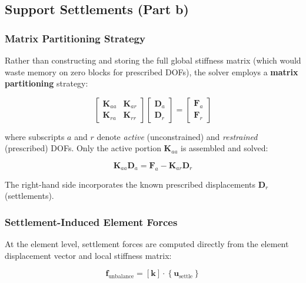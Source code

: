 \documentclass[12pt,a4paper]{article}
\begin{document}
\subsection{Support Settlements (Part b)}

\subsubsection{Matrix Partitioning Strategy}

Rather than constructing and storing the full global stiffness matrix (which would waste memory on zero blocks for prescribed DOFs), the solver employs a \textbf{matrix partitioning} strategy:

\begin{equation}
    \begin{bmatrix}
        \mathbf{K}_{aa} & \mathbf{K}_{ar} \\
        \mathbf{K}_{ra} & \mathbf{K}_{rr}
    \end{bmatrix}
    \begin{bmatrix}
        \mathbf{D}_a \\ \mathbf{D}_r
    \end{bmatrix}
    =
    \begin{bmatrix}
        \mathbf{F}_a \\ \mathbf{F}_r
    \end{bmatrix}
\end{equation}

\noindent where subscripts $a$ and $r$ denote \textit{active} (unconstrained) and \textit{restrained} (prescribed) DOFs. Only the active portion $\mathbf{K}_{aa}$ is assembled and solved:

\begin{equation}
    \mathbf{K}_{aa} \mathbf{D}_a = \mathbf{F}_a - \mathbf{K}_{ar} \mathbf{D}_r
\end{equation}

The right-hand side incorporates the known prescribed displacements $\mathbf{D}_r$ (settlements).

\subsubsection{Settlement-Induced Element Forces}

At the element level, settlement forces are computed directly from the element displacement vector and local stiffness matrix:

\begin{equation}
    \mathbf{f}_{\text{unbalance}} = [\mathbf{k}] \cdot \left\{\mathbf{u}_{\text{settle}}\right\}
\end{equation}
\end{document}
